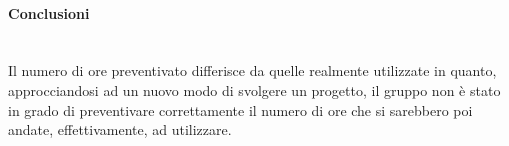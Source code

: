 \paragraph{Conclusioni} \-\\
Il numero di ore preventivato differisce da quelle realmente utilizzate in quanto, approcciandosi ad un nuovo modo di svolgere un progetto, il gruppo non è stato in grado di preventivare correttamente il numero di ore che si sarebbero poi andate, effettivamente, ad utilizzare. \\



